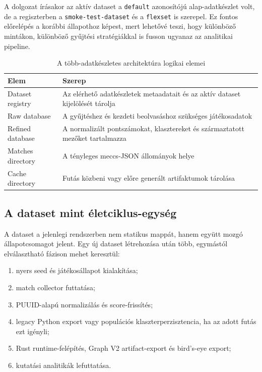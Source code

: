 ﻿\documentclass[a4paper,12pt]{report}
\begin{document}
A dolgozat írásakor az aktív dataset a \texttt{default} azonosítójú alap-adatkészlet volt, de a regiszterben a \texttt{smoke-test-dataset} és a \texttt{flexset} is szerepel. Ez fontos előrelépés a korábbi állapothoz képest, mert lehetővé teszi, hogy különböző mintákon, különböző gyűjtési stratégiákkal is fusson ugyanaz az analitikai pipeline.

\begin{table}[H]
\centering
\caption{A több-adatkészletes architektúra logikai elemei}
\begin{tabularx}{\textwidth}{>{\raggedright\arraybackslash}p{3.2cm}X}
\toprule
\textbf{Elem} & \textbf{Szerep} \\
\midrule
Dataset registry & Az elérhető adatkészletek metaadatait és az aktív dataset kijelölését tárolja \\
Raw database & A gyűjtéshez és kezdeti beolvasáshoz szükséges játékosadatok \\
Refined database & A normalizált pontszámokat, klasztereket és származtatott mezőket tartalmazza \\
Matches directory & A tényleges meccs-JSON állományok helye \\
Cache directory & Futás közbeni vagy előre generált artifaktumok tárolása \\
\bottomrule
\end{tabularx}
\end{table}

\subsection{A dataset mint életciklus-egység}

A dataset a jelenlegi rendszerben nem statikus mappát, hanem együtt mozgó állapotcsomagot jelent. Egy új dataset létrehozása után több, egymástól elválasztható fázison mehet keresztül:

\begin{enumerate}
    \item nyers seed és játékosállapot kialakítása;
    \item match collector futtatása;
    \item PUUID-alapú normalizálás és score-frissítés;
    \item legacy Python export vagy populációs klaszterperzisztencia, ha az adott futás ezt igényli;
    \item Rust runtime-felépítés, Graph V2 artifact-export és bird's-eye export;
    \item kutatási analitikák lefuttatása.
\end{enumerate}
\end{document}
